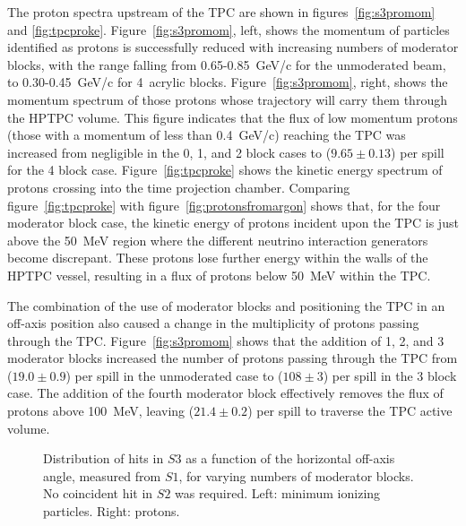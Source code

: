 The proton spectra upstream of the TPC are shown in figures~\ref{fig:s3promom} and \ref{fig:tpcproke}. 
Figure~\ref{fig:s3promom}, left, shows the momentum of particles identified as protons is successfully reduced with increasing numbers of moderator blocks, with the range falling from 0.65-0.85~GeV/c for the unmoderated beam, to 0.30-0.45~GeV/c for 4~acrylic blocks.
Figure~\ref{fig:s3promom}, right, shows the momentum spectrum of those protons whose trajectory will carry them through the HPTPC volume.
This figure indicates that the flux of low momentum protons (those with a momentum of less than 0.4~GeV/c) reaching the TPC was increased from negligible in the 0, 1, and 2 block cases to ($9.65 \pm 0.13$) per spill for the 4 block case.
Figure~\ref{fig:tpcproke} shows the kinetic energy spectrum of protons crossing into the time projection chamber.
Comparing figure~\ref{fig:tpcproke} with figure~\ref{fig:protonsfromargon} shows that, for the four moderator block case, the kinetic energy of protons incident upon the TPC is just above the 50~MeV region where the different neutrino interaction generators become discrepant.
These protons lose further energy within the walls of the HPTPC vessel, resulting in a flux of protons below 50~MeV within the TPC.

The combination of the use of moderator blocks and positioning the TPC in an off-axis position also caused a change in the multiplicity of protons passing through the TPC.
Figure~\ref{fig:s3promom} shows that the addition of 1, 2, and 3 moderator blocks increased the number of protons passing through the TPC from ($19.0 \pm 0.9$) per spill in the unmoderated case to ($108 \pm 3$) per spill in the 3 block case.
The addition of the fourth moderator block effectively removes the flux of protons above 100~MeV, leaving ($21.4 \pm 0.2$) per spill to traverse the TPC active volume.
  
\begin{figure}[h]
  \begin{minipage}{0.48\textwidth}
    \begin{adjustbox}{max totalsize={\textwidth}{.35\textheight},center}
      
    \end{adjustbox}
  \end{minipage}
  \hspace{0.3cm}
  \begin{minipage}{0.48\textwidth}
    \begin{adjustbox}{max totalsize={\textwidth}{.35\textheight},center}
      
    \end{adjustbox}
  \end{minipage}
    \caption{\label{fig:s1s3mips}Distribution of hits in $\mathit{S3}$ as a function of the horizontal off-axis angle, measured from $\mathit{S1}$, for varying numbers of moderator blocks. No coincident hit in $\mathit{S2}$ was required. Left: minimum ionizing particles. Right: protons.}
\end{figure}

